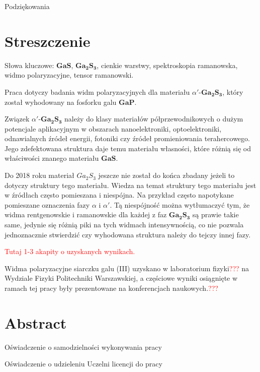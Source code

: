 Podziękowania

\newpage

\section*{Streszczenie}

Słowa kluczowe: $\mathbf{GaS}$, $\mathbf{Ga_{2}S_{3}}$, cienkie warstwy, spektroskopia ramanowska, widmo polaryzacyjne, tensor ramanowski.

Praca dotyczy badania widm polaryzacyjnych dla materiału $\alpha'$-$\mathbf{Ga_{2}S_{3}}$, który został wyhodowany na fosforku galu $\mathbf{GaP}$. 

Związek $\alpha'$-$\mathbf{Ga_{2}S_{3}}$ należy do klasy materiałów półprzewodnikowych o dużym potencjale aplikacyjnym w obszarach nanoelektroniki, optoelektroniki, odnawialnych źródeł energii, fotoniki czy źródeł promieniowania terahercowego. Jego zdefektowana struktura daje temu materiału własności, które różnią się od właściwości znanego materiału $\mathbf{GaS}$.

Do 2018 roku materiał $Ga_{2}S_{3}$ jeszcze nie został do końca zbadany jeżeli to dotyczy struktury tego materiału. Wiedza na temat struktury tego materiału jest w źródłach często pomieszana i niespójna. Na przykład często napotykane pomieszane oznaczenia fazy $\alpha$ i $\alpha'$. Tą niespójność można wytłumaczyć tym, że widma rentgenowskie i ramanowskie dla każdej z faz $\mathbf{Ga_{2}S_{3}}$ są prawie takie same, jedynie się różnią piki na tych widmach intensywnością, co nie pozwala jednoznacznie stwierdzić czy wyhodowana struktura należy do tejczy innej fazy.

\textcolor{red}{Tutaj 1-3 akapity o uzyskanych wynikach.}

Widma polaryzacyjne siarczku galu (III) uzyskano w laboratorium fizyki\textcolor{red}{???} na Wydziale Fizyki Politechniki Warszawskiej, a częściowe wyniki osiągnięte w ramach tej pracy były prezentowane na konferencjach naukowych.\textcolor{red}{???}  

\newpage

\section*{Abstract}

\newpage

Oświadczenie o samodzielności wykonywania pracy

\newpage

Oświadczenie o udzieleniu Uczelni licencji do pracy

\newpage